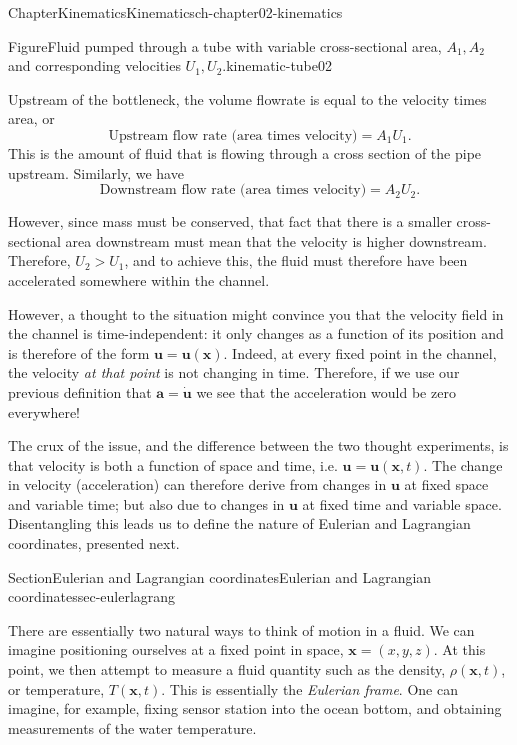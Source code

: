 \documentclass[oneside,10pt,]{book}
\numberwithin{equation}{section}
\newcommand{\bx}{\boldsymbol{x}}
\newcommand{\bu}{\boldsymbol{u}}
\newcommand{\ba}{\boldsymbol{a}}
\begin{document}
\begin{chapterptx}{Chapter}{Kinematics}{}{Kinematics}{}{}{ch-chapter02-kinematics}
\begin{introduction}{}
\begin{figureptx}{Figure}{Fluid pumped through a tube with variable cross-sectional area, \(A_1, A_2\) and corresponding velocities \(U_1, U_2\).}{kinematic-tube02}{}
\begin{image}{0.1}{0.8}{0.1}{}
\end{image}%
\tcblower
\end{figureptx}%
Upstream of the bottleneck, the volume flowrate is equal to the velocity times area, or%
\begin{equation*}
\textrm{Upstream flow rate (area times velocity)} = A_1 U_1.
\end{equation*}
This is the amount of fluid that is flowing through a cross section of the pipe upstream. Similarly, we have%
\begin{equation*}
\textrm{Downstream flow rate (area times velocity)} = A_2 U_2.
\end{equation*}
%
\par
However, since mass must be conserved, that fact that there is a smaller cross-sectional area downstream must mean that the velocity is higher downstream. Therefore, \(U_2 > U_1\), and to achieve this, the fluid must therefore have been accelerated somewhere within the channel.%
\par
However, a thought to the situation might convince you that the velocity field in the channel is time-independent: it only changes as a function of its position and is therefore of the form \(\bu = \bu(\bx)\). Indeed, at every fixed point in the channel, the velocity \emph{at that point} is not changing in time. Therefore, if we use our previous definition that \(\ba = \dot{\bu}\) we see that the acceleration would be zero everywhere!%
\par
The crux of the issue, and the difference between the two thought experiments, is that velocity is both a function of space and time, i.e. \(\bu = \bu(\bx, t)\). The change in velocity (acceleration) can therefore derive from changes in \(\bu\) at fixed space and variable time; but also due to changes in \(\bu\) at fixed time and variable space. Disentangling this leads us to define the nature of Eulerian and Lagrangian coordinates, presented next.%
\end{introduction}%
%
%
\typeout{************************************************}
\typeout{************************************************}
%
\begin{sectionptx}{Section}{Eulerian and Lagrangian coordinates}{}{Eulerian and Lagrangian coordinates}{}{}{sec-eulerlagrang}
\begin{introduction}{}%
There are essentially two natural ways to think of motion in a fluid. We can imagine positioning ourselves at a fixed point in space, \(\bx = (x, y, z)\). At this point, we then attempt to measure a fluid quantity such as the density, \(\rho(\bx, t)\), or temperature, \(T(\bx, t)\). This is essentially the \emph{Eulerian frame}. One can imagine, for example, fixing sensor station into the ocean bottom, and obtaining measurements of the water temperature.%

\end{introduction}
\end{sectionptx}
\end{chapterptx}
\end{document}
